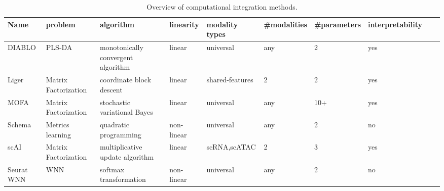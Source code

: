 \begin{table}[!ht]
    \tiny
	\centering
	\begin{tabular}{llllllllll}
		\toprule
	   Name & problem &algorithm & linearity & modality types & \#modalities & \#parameters & interpretability \\
		\midrule
        DIABLO &PLS-DA& monotonically convergent algorithm & linear& universal & any & 2 & yes \\
        Liger &Matrix Factorization& coordinate block descent &linear& shared-features& 2 & 2 & yes \\
        MOFA   &Matrix Factorization& stochastic variational Bayes &linear& universal & any & 10+ & yes \\
        Schema &Metrics learning& quadratic programming  &  non-linear & universal& any & 2 & no\\
        scAI &Matrix Factorization& multiplicative update algorithm &linear& scRNA,scATAC & 2 & 3 & yes &\\
        Seurat WNN  & WNN & softmax transformation &non-linear&universal & any & 2 & no &\\
		\bottomrule
	\end{tabular}
	\vspace{0.1cm}
	\caption[Overview of computational integration methods]{Overview of computational integration methods.}
	\label{tab:methods_integration_overview}
\end{table}
%


